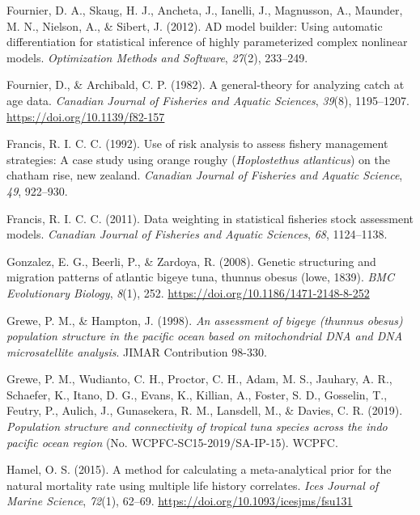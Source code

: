 \documentclass[
  english,
  a4paper,
  a4paper,
  11pt]{SCreport}
\newlength{\cslhangindent}
\newenvironment{CSLReferences}[2] %
 {\begin{list}{}{%
  \setlength{\itemindent}{0pt}
  \setlength{\leftmargin}{0pt}
  \setlength{\parsep}{0pt}
  \ifodd #1
   \setlength{\leftmargin}{\cslhangindent}
   \setlength{\itemindent}{-1\cslhangindent}
  \fi
  \setlength{\itemsep}{#2\baselineskip}}}
 {\end{list}}
\begin{document}
\begin{CSLReferences}{1}{0}
Fournier, D. A., Skaug, H. J., Ancheta, J., Ianelli, J., Magnusson, A.,
Maunder, M. N., Nielson, A., \& Sibert, J. (2012). {AD} model builder:
Using automatic differentiation for statistical inference of highly
parameterized complex nonlinear models. \emph{Optimization Methods and
Software}, \emph{27}(2), 233--249.

Fournier, D., \& Archibald, C. P. (1982). A general-theory for analyzing
catch at age data. \emph{Canadian Journal of Fisheries and Aquatic
Sciences}, \emph{39}(8), 1195--1207.
\url{https://doi.org/10.1139/f82-157}

Francis, R. I. C. C. (1992). Use of risk analysis to assess fishery
management strategies: A case study using orange roughy
({\emph{Hoplostethus atlanticus}}) on the chatham rise, new zealand.
\emph{Canadian Journal of Fisheries and Aquatic Science}, \emph{49},
922--930.

Francis, R. I. C. C. (2011). Data weighting in statistical fisheries
stock assessment models. \emph{Canadian Journal of Fisheries and Aquatic
Sciences}, \emph{68}, 1124--1138.

Gonzalez, E. G., Beerli, P., \& Zardoya, R. (2008). Genetic structuring
and migration patterns of atlantic bigeye tuna, thunnus obesus (lowe,
1839). \emph{{BMC} Evolutionary Biology}, \emph{8}(1), 252.
\url{https://doi.org/10.1186/1471-2148-8-252}

Grewe, P. M., \& Hampton, J. (1998). \emph{An assessment of bigeye
(thunnus obesus) population structure in the pacific ocean based on
mitochondrial {DNA} and {DNA} microsatellite analysis}. {JIMAR}
Contribution 98-330.

Grewe, P. M., Wudianto, C. H., Proctor, C. H., Adam, M. S., Jauhary, A.
R., Schaefer, K., Itano, D. G., Evans, K., Killian, A., Foster, S. D.,
Gosselin, T., Feutry, P., Aulich, J., Gunasekera, R. M., Lansdell, M.,
\& Davies, C. R. (2019). \emph{Population structure and connectivity of
tropical tuna species across the indo pacific ocean region} (No.
{WCPFC}-{SC}15-2019/{SA}-{IP}-15). WCPFC.

Hamel, O. S. (2015). A method for calculating a meta-analytical prior
for the natural mortality rate using multiple life history correlates.
\emph{Ices Journal of Marine Science}, \emph{72}(1), 62--69.
\url{https://doi.org/10.1093/icesjms/fsu131}


\end{CSLReferences}
\end{document}

